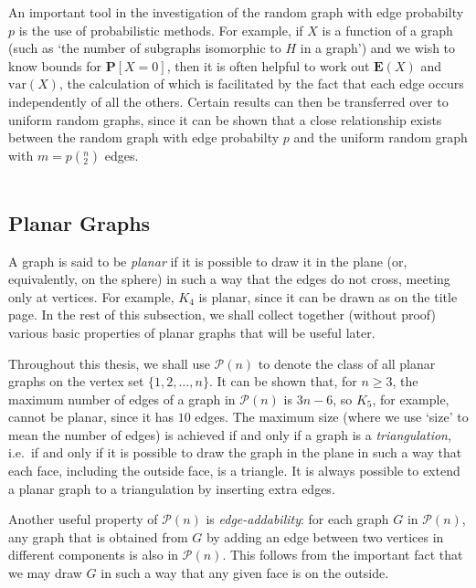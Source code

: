 \documentclass{article}
\newtheorem{Proof of Theorem}{Proof of Theorem}
\begin{document}
An important tool in the investigation of the random graph with edge probabilty $p$ is the use of probabilistic methods.
For example, if $X$ is a function of a graph 
(such as `the number of subgraphs isomorphic to $H$ in a graph')
and we wish to know bounds for $\mathbf{P}[X=0]$,
then it is often helpful to work out $\mathbf{E}(X)$ and $\textrm{var}(X)$,
the calculation of which is facilitated by the fact that each edge occurs independently of all the others.
Certain results can then be transferred over to uniform random graphs,
since it can be shown that a close relationship exists between the random graph with edge probabilty $p$
and the uniform random graph with $m=p \left( ^{n}_{2} \right)$ edges. \\
\\















\subsection*{Planar Graphs} 

A graph is said to be \textit{planar} if it is possible to draw it in the plane 
(or, equivalently, on the sphere) in such a way that the edges do not cross, meeting only at vertices.
For example, $K_{4}$ is planar, since it can be drawn as on the title page.
In the rest of this subsection,
we shall collect together (without proof) various basic properties of planar graphs that will be useful later.

Throughout this thesis,
we shall use $\mathcal{P}(n)$ to denote the class of all planar graphs on the vertex set $\{ 1,2, \ldots, n \}$.
It can be shown that, for $n \geq 3$, 
the maximum number of edges of a graph in $\mathcal{P}(n)$
is $3n-6$, so $K_{5}$, for example, cannot be planar, since it has $10$ edges.
The maximum size 
(where we use `size' to mean the number of edges)
is achieved if and only if a graph is a \textit{triangulation},
i.e.~if and only if it is possible to draw the graph in the plane
in such a way that each face, including the outside face, is a triangle.
It is always possible to extend a planar graph to a triangulation by inserting extra edges.

Another useful property of $\mathcal{P}(n)$ is \textit{edge-addability}: \label{planar}
for each graph $G$ in $\mathcal{P}(n)$, 
any graph that is obtained from $G$ by adding an edge between two vertices in different components 
is also in $\mathcal{P}(n)$.
This follows from the important fact that we may draw $G$ in such a way that any given face is on the outside. \\ 
\\
\end{document}
